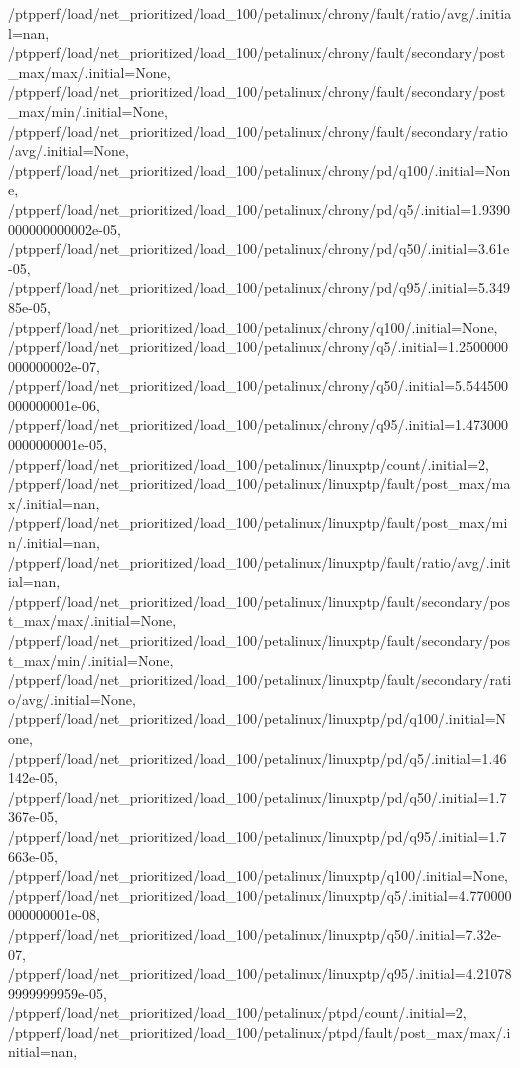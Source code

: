 {    /ptpperf/load/net_prioritized/load_100/petalinux/chrony/fault/ratio/avg/.initial=nan,
    /ptpperf/load/net_prioritized/load_100/petalinux/chrony/fault/secondary/post_max/max/.initial=None,
    /ptpperf/load/net_prioritized/load_100/petalinux/chrony/fault/secondary/post_max/min/.initial=None,
    /ptpperf/load/net_prioritized/load_100/petalinux/chrony/fault/secondary/ratio/avg/.initial=None,
    /ptpperf/load/net_prioritized/load_100/petalinux/chrony/pd/q100/.initial=None,
    /ptpperf/load/net_prioritized/load_100/petalinux/chrony/pd/q5/.initial=1.9390000000000002e-05,
    /ptpperf/load/net_prioritized/load_100/petalinux/chrony/pd/q50/.initial=3.61e-05,
    /ptpperf/load/net_prioritized/load_100/petalinux/chrony/pd/q95/.initial=5.34985e-05,
    /ptpperf/load/net_prioritized/load_100/petalinux/chrony/q100/.initial=None,
    /ptpperf/load/net_prioritized/load_100/petalinux/chrony/q5/.initial=1.2500000000000002e-07,
    /ptpperf/load/net_prioritized/load_100/petalinux/chrony/q50/.initial=5.544500000000001e-06,
    /ptpperf/load/net_prioritized/load_100/petalinux/chrony/q95/.initial=1.4730000000000001e-05,
    /ptpperf/load/net_prioritized/load_100/petalinux/linuxptp/count/.initial=2,
    /ptpperf/load/net_prioritized/load_100/petalinux/linuxptp/fault/post_max/max/.initial=nan,
    /ptpperf/load/net_prioritized/load_100/petalinux/linuxptp/fault/post_max/min/.initial=nan,
    /ptpperf/load/net_prioritized/load_100/petalinux/linuxptp/fault/ratio/avg/.initial=nan,
    /ptpperf/load/net_prioritized/load_100/petalinux/linuxptp/fault/secondary/post_max/max/.initial=None,
    /ptpperf/load/net_prioritized/load_100/petalinux/linuxptp/fault/secondary/post_max/min/.initial=None,
    /ptpperf/load/net_prioritized/load_100/petalinux/linuxptp/fault/secondary/ratio/avg/.initial=None,
    /ptpperf/load/net_prioritized/load_100/petalinux/linuxptp/pd/q100/.initial=None,
    /ptpperf/load/net_prioritized/load_100/petalinux/linuxptp/pd/q5/.initial=1.46142e-05,
    /ptpperf/load/net_prioritized/load_100/petalinux/linuxptp/pd/q50/.initial=1.7367e-05,
    /ptpperf/load/net_prioritized/load_100/petalinux/linuxptp/pd/q95/.initial=1.7663e-05,
    /ptpperf/load/net_prioritized/load_100/petalinux/linuxptp/q100/.initial=None,
    /ptpperf/load/net_prioritized/load_100/petalinux/linuxptp/q5/.initial=4.770000000000001e-08,
    /ptpperf/load/net_prioritized/load_100/petalinux/linuxptp/q50/.initial=7.32e-07,
    /ptpperf/load/net_prioritized/load_100/petalinux/linuxptp/q95/.initial=4.210789999999959e-05,
    /ptpperf/load/net_prioritized/load_100/petalinux/ptpd/count/.initial=2,
    /ptpperf/load/net_prioritized/load_100/petalinux/ptpd/fault/post_max/max/.initial=nan,
}
